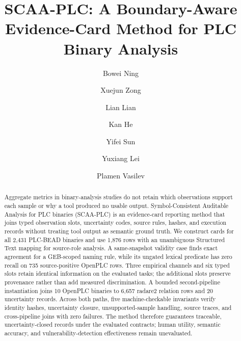 \documentclass[manuscript,screen,review]{acmart}
\begin{document}
\title{SCAA-PLC: A Boundary-Aware Evidence-Card Method for PLC Binary Analysis}

\author{Bowei Ning}

\author{Xuejun Zong}
\author{Lian Lian}
\author{Kan He}
\author{Yifei Sun}
\author{Yuxiang Lei}

\author{Plamen Vasilev}

\renewcommand{\shortauthors}{Ning et al.}

\begin{abstract}
Aggregate metrics in binary-analysis studies do not retain which observations support each sample or why a tool produced no usable output. Symbol-Consistent Auditable Analysis for PLC binaries (SCAA-PLC) is an evidence-card reporting method that joins typed observation slots, uncertainty codes, source rules, hashes, and execution records without treating tool output as semantic ground truth. We construct cards for all 2{,}431 PLC-BEAD binaries and use 1{,}876 rows with an unambiguous Structured Text mapping for source-role analysis. A same-snapshot validity case finds exact agreement for a GEB-scoped naming rule, while its ungated lexical predicate has zero recall on 735 source-positive OpenPLC rows. Three empirical channels and six typed slots retain identical information on the evaluated tasks; the additional slots preserve provenance rather than add measured discrimination. A bounded second-pipeline instantiation joins 10 OpenPLC binaries to 6{,}657 radare2 relation rows and 20 uncertainty records. Across both paths, five machine-checkable invariants verify identity hashes, uncertainty closure, unsupported-sample handling, source traces, and cross-pipeline joins with zero failures. The method therefore guarantees traceable, uncertainty-closed records under the evaluated contracts; human utility, semantic accuracy, and vulnerability-detection effectiveness remain unevaluated.
\end{abstract}
\end{document}
